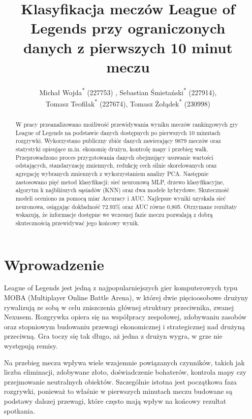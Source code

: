 \documentclass[twoside]{customStyle}
\title{Klasyfikacja meczów League of Legends przy ograniczonych danych z pierwszych 10 minut meczu}
\author{%
  Michał Wojda\textsuperscript{*} {\small (227753)} ,
  Sebastian Śmietański\textsuperscript{*} {\small (227914)}, \\
  Tomasz Teofilak\textsuperscript{*} {\small (227674)},
  Tomasz Żołądek\textsuperscript{*} {\small (230998)}%
}
\newcommand{\getAccuracyNn}{72.93}
\newcommand{\getAucNn}{0,805}
\begin{document}
\maketitle

\begin{abstract}
W pracy przeanalizowano możliwość przewidywania wyniku meczów rankingowych gry League of Legends na podstawie danych dostępnych po pierwszych 10 minutach rozgrywki. Wykorzystano publiczny zbiór danych zawierający 9879 meczów oraz statystyki opisujące m.in. ekonomię drużyn, kontrolę mapy i przebieg walk. Przeprowadzono proces przygotowania danych obejmujący usuwanie wartości odstających, standaryzację zmiennych, redukcję cech silnie skorelowanych oraz agregację wybranych zmiennych z wykorzystaniem analizy PCA. Następnie zastosowano pięć metod klasyfikacji: sieć neuronową MLP, drzewo klasyfikacyjne, algorytm k najbliższych sąsiadów (KNN) oraz dwa modele hybrydowe. Skuteczność modeli oceniono za pomocą miar Accuracy i AUC. Najlepsze wyniki uzyskała sieć neuronowa, osiągając dokładność \getAccuracyNn\% oraz AUC równe \getAucNn. Otrzymane rezultaty wskazują, że informacje dostępne we wczesnej fazie meczu pozwalają z dobrą skutecznością przewidywać jego końcowy wynik.

\end{abstract}
\small
\tableofcontents
\normalsize
\newpage

\section{Wprowadzenie}
League of Legends jest jedną z najpopularniejszych gier komputerowych typu MOBA (Multiplayer Online Battle Arena), w której dwie pięcioosobowe drużyny rywalizują ze sobą w celu zniszczenia głównej struktury przeciwnika, zwanej Nexusem. Rozgrywka opiera się na współpracy zespołowej, zdobywaniu zasobów oraz stopniowym budowaniu przewagi ekonomicznej i strategicznej nad drużyną przeciwną. Gra toczy się tak długo, aż jedna z drużyn wygra, w grze nie występują remisy.

Na przebieg meczu wpływa wiele wzajemnie powiązanych czynników, takich jak liczba eliminacji, zdobywane złoto, doświadczenie bohaterów, kontrola mapy czy przejmowanie neutralnych obiektów. Szczególnie istotna jest początkowa faza rozgrywki, ponieważ to właśnie w pierwszych minutach meczu budowane są podstawy dalszej przewagi, które często mają wpływ na końcowy rezultat spotkania.
\end{document}
